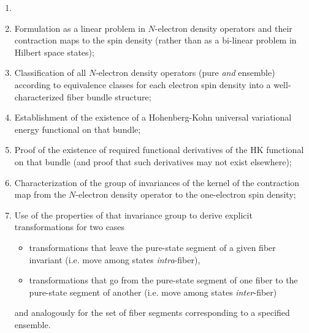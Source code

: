 \documentclass[nofootinbib,floatfix,aps,pra,preprint]{revtex4}
\begin{document}
\begin{enumerate}
\item \textrm{\vspace{-0.15cm} }

\item \textrm{Formulation as a linear problem in $N$-electron density
operators and their contraction maps to the spin density (rather than as a
bi-linear problem in Hilbert space states); }

\item \textrm{Classification of all $N$-electron density operators (pure 
\emph{and} ensemble) according to equivalence classes for each electron spin
density into a well-characterized fiber bundle structure;\vspace{-0.21cm} }

\item \textrm{Establishment of the existence of a Hohenberg-Kohn universal
variational energy functional on that bundle;\vspace{-0.21cm} }

\item \textrm{Proof of the existence of required functional derivatives of
the HK functional on that bundle (and proof that such derivatives may not
exist elsewhere);\vspace{-0.21cm} }

\item \textrm{Characterization of the group of invariances of the kernel of
the contraction map from the $N$-electron density operator to the
one-electron spin density;\vspace{-0.21cm} }

\item \textrm{Use of the properties of that invariance group to derive
explicit transformations for two cases }

\begin{itemize}
\item \textrm{transformations that leave the pure-state segment of a given
fiber invariant (i.e. move among states \emph{intra}-fiber), }

\item \textrm{transformations that go from the pure-state segment of one
fiber to the pure-state segment of another (i.e. move among states \emph{%
inter}-fiber) }
\end{itemize}

\textrm{and analogously for the set of fiber segments corresponding to a
specified ensemble. \vspace{-0.21cm} }
\end{enumerate}
\end{document}
